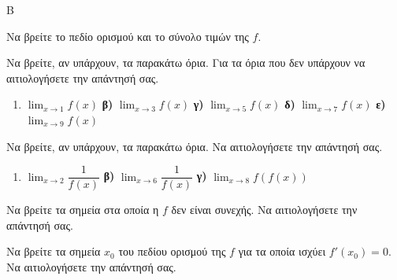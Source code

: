 \begin{thema}{Β}
\begin{center}
\end{center}
\vspace{4pt}

\begin{erwthma}
    \item Να βρείτε το πεδίο ορισμού και το σύνολο τιμών της $f$. 
    \item Να βρείτε, αν υπάρχουν, τα παρακάτω όρια. Για τα όρια που δεν υπάρχουν να αιτιολογήσετε την απάντησή σας.
    \begin{enumerate}[label=\alph*)]
        \item $\displaystyle\lim_{x \to 1} f(x)$ \quad
        \textbf{β)} $\displaystyle\lim_{x \to 3} f(x)$ \quad
        \textbf{γ)} $\displaystyle\lim_{x \to 5} f(x)$ \quad
        \textbf{δ)} $\displaystyle\lim_{x \to 7} f(x)$ \quad
        \textbf{ε)} $\displaystyle\lim_{x \to 9} f(x)$
    \end{enumerate}
    \item Να βρείτε, αν υπάρχουν, τα παρακάτω όρια. Να αιτιολογήσετε την απάντησή σας.
    \begin{enumerate}[label=\alph*)]
        \item $\displaystyle\lim_{x \to 2} \dfrac{1}{f(x)}$ \quad
        \textbf{β)} $\displaystyle\lim_{x \to 6} \dfrac{1}{f(x)}$ \quad
        \textbf{γ)} $\displaystyle\lim_{x \to 8} f(f(x))$
    \end{enumerate}
    \item Να βρείτε τα σημεία στα οποία η $f$ δεν είναι συνεχής. Να αιτιολογήσετε την απάντησή σας. 
    \item Να βρείτε τα σημεία $x_0$ του πεδίου ορισμού της $f$ για τα οποία ισχύει $f'(x_0) = 0$. Να αιτιολογήσετε την απάντησή σας. 
\end{erwthma}
\end{thema}
